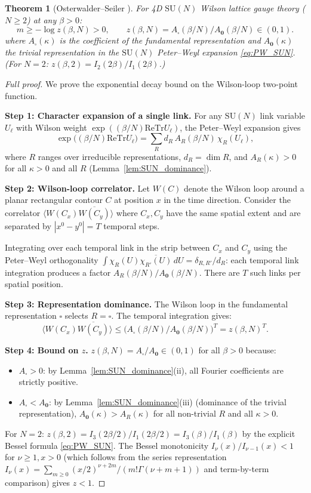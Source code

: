 \documentclass[11pt,a4paper]{amsart}
\newtheorem{theorem}{Theorem}[section]
\theoremstyle{definition}
\newcommand{\SU}{\mathrm{SU}}
\newcommand{\re}{\mathrm{Re}}
\newcommand{\Tr}{\mathrm{Tr}}
\begin{document}
\begin{theorem}[Osterwalder--Seiler {\cite{OS78}}]
\label{thm:OS}
For 4D $\SU(N)$ Wilson lattice gauge theory ($N\ge 2$) at any $\beta > 0$:
\[
  m \ge -\log z(\beta,N) > 0,
  \qquad
  z(\beta,N) = A_{\square}(\beta/N)/A_{\mathbf{0}}(\beta/N) \in (0,1).
\]
where $A_{\square}(\kappa)$ is the coefficient of the fundamental representation
and $A_{\mathbf{0}}(\kappa)$ the trivial representation in the
$\SU(N)$ Peter--Weyl expansion \eqref{eq:PW_SUN}.
\emph{(For $N=2$: $z(\beta,2) = I_2(2\beta)/I_1(2\beta)$.)}
\end{theorem}
\begin{proof}[Full proof]
We prove the exponential decay bound on the Wilson-loop two-point function.

\textbf{Step 1: Character expansion of a single link.}
For any $\SU(N)$ link variable $U_\ell$ with Wilson weight
$\exp((\beta/N)\re\Tr U_\ell)$, the Peter--Weyl expansion gives
\[
  \exp\!\bigl((\beta/N)\re\Tr U_\ell\bigr)
  = \sum_R d_R\,A_R(\beta/N)\,\chi_R(U_\ell),
\]
where $R$ ranges over irreducible representations, $d_R = \dim R$,
and $A_R(\kappa) > 0$ for all $\kappa > 0$ and all $R$
(Lemma~\ref{lem:SUN_dominance}).

\textbf{Step 2: Wilson-loop correlator.}
Let $W(C)$ denote the Wilson loop around a planar rectangular contour $C$
at position $x$ in the time direction.  Consider the correlator
$\langle W(C_x)\overline{W(C_y)}\rangle$ where $C_x, C_y$ have the same
spatial extent and are separated by $|x^0 - y^0| = T$ temporal steps.

Integrating over each temporal link in the strip between $C_x$ and $C_y$
using the Peter--Weyl orthogonality
$\int \chi_R(U)\overline{\chi_{R'}(U)}\,dU = \delta_{R,R'}/d_R$:
each temporal link integration produces a factor $A_R(\beta/N)/A_{\mathbf{0}}(\beta/N)$.
There are $T$ such links per spatial position.

\textbf{Step 3: Representation dominance.}
The Wilson loop in the fundamental representation $\square$ selects
$R = \square$.  The temporal integration gives:
\[
  \langle W(C_x)\overline{W(C_y)}\rangle
  \le \bigl(A_\square(\beta/N)/A_{\mathbf{0}}(\beta/N)\bigr)^T
  = z(\beta,N)^T.
\]

\textbf{Step 4: Bound on $z$.}
$z(\beta,N) = A_\square/A_{\mathbf{0}} \in (0,1)$ for all $\beta > 0$ because:
\begin{itemize}
\item $A_\square > 0$: by Lemma~\ref{lem:SUN_dominance}(ii), all Fourier
  coefficients are strictly positive.
\item $A_\square < A_{\mathbf{0}}$: by Lemma~\ref{lem:SUN_dominance}(iii)
  (dominance of the trivial representation), $A_{\mathbf{0}}(\kappa)
  > A_R(\kappa)$ for all non-trivial $R$ and all $\kappa > 0$.
\end{itemize}
For $N=2$: $z(\beta,2) = I_3(2\beta/2)/I_1(2\beta/2) = I_3(\beta)/I_1(\beta)$
by the explicit Bessel formula \eqref{eq:PW_SUN}.
The Bessel monotonicity $I_\nu(x)/I_{\nu-1}(x) < 1$ for $\nu \ge 1, x > 0$
(which follows from the series representation
$I_\nu(x) = \sum_{m\ge 0}(x/2)^{\nu+2m}/(m!\Gamma(\nu+m+1))$
and term-by-term comparison) gives $z < 1$.


\end{proof}
\end{document}
